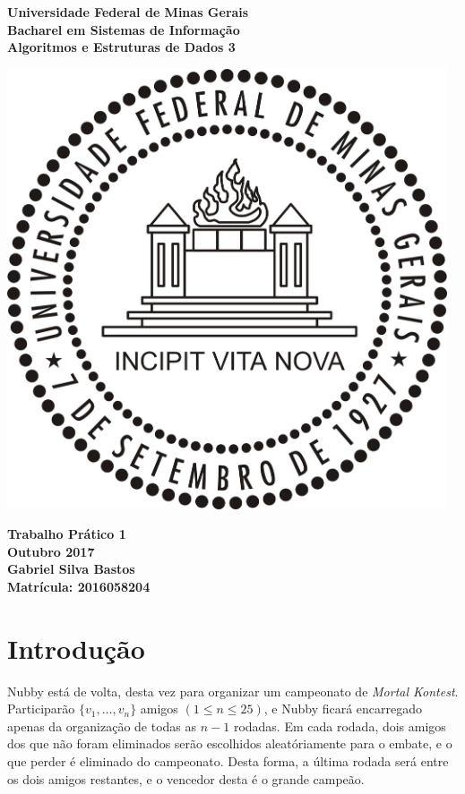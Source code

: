 \documentclass{article}
\begin{document}
\begin{titlepage}
  \centering
  
  \vfill{
    \bfseries\Huge
    Universidade Federal de Minas Gerais\\[5pt]
    \bfseries\Large
    Bacharel em Sistemas de Informação \\
    Algoritmos e Estruturas de Dados 3\\
  }
  
  \vfill
  
  \includegraphics[width=13cm]{images/ufmg_logo.jpg}
  
  \vfill{
    \bfseries\Large
    Trabalho Prático 1\\
    Outubro 2017\\
  }
  \vfill{
    \bfseries\large
    Gabriel Silva Bastos\\[5pt]
    Matrícula: 2016058204
  }
\end{titlepage}


\section{Introdução}
Nubby está de volta, desta vez para organizar um campeonato de \textit{Mortal Kontest}. Participarão $\{ v_1, \hdots, v_n \}$ amigos $(1 \leq n \leq 25)$, e Nubby ficará encarregado apenas da organização de todas as $n - 1$ rodadas. Em cada rodada, dois amigos dos que não foram eliminados serão escolhidos aleatóriamente para o embate, e o que perder é eliminado do campeonato. Desta forma, a última rodada será entre os dois amigos restantes, e o vencedor desta é o grande campeão.
\end{document}
